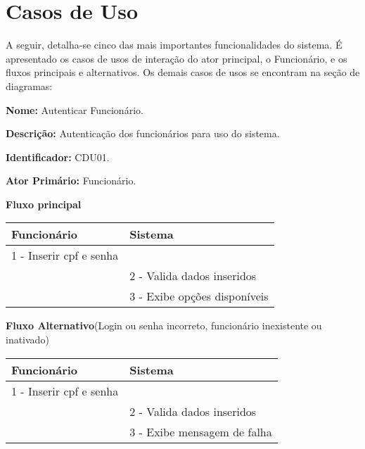 \section{Casos de Uso}\label{casosdeuso}
\par 
A seguir, detalha-se cinco das mais importantes funcionalidades do sistema. É apresentado os casos de usos de interação do ator principal, o Funcionário, e os fluxos principais e alternativos. Os demais casos de usos se encontram na seção de diagramas:

\par
\textbf{Nome:} Autenticar Funcionário. 
\par
\textbf{Descrição:} Autenticação dos funcionários para uso do sistema.
\par 
\textbf{Identificador:} CDU01.
\par
\textbf{Ator Primário:} Funcionário.	
\par
\par
\textbf{Fluxo principal}\par
\begin{tabular}{|p{7cm}|p{7cm}|}
	\hline 
	Funcionário & Sistema \\ 
	\hline 
	1 - Inserir cpf e senha  &  \\ 
	\hline 
	& 
	
	2 - Valida dados inseridos 
	\\ 
	\hline 
	& 
	
	3 - Exibe opções disponíveis
	\\ 
	\hline 
\end{tabular} 

\par
\textbf{Fluxo Alternativo}(Login ou senha incorreto, funcionário inexistente ou inativado)\par
\begin{tabular}{|p{7cm}|p{7cm}|}
	\hline 
	Funcionário & Sistema \\ 
	\hline 
	1 - Inserir cpf e senha  &  \\ 
	\hline 
	& 
	
	2 - Valida dados inseridos 
	\\ 
	\hline 
	& 
	
	3 - Exibe mensagem de falha		
	\\ 
	\hline 
\end{tabular} 


